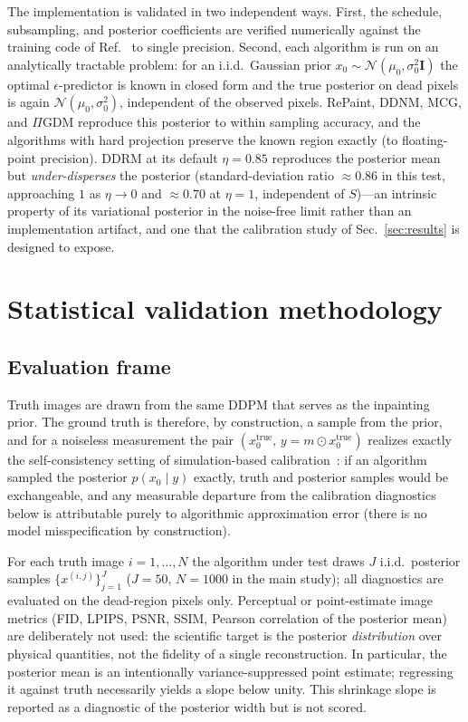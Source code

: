 The implementation is validated in two independent ways.  First, the
schedule, subsampling, and posterior coefficients are verified
numerically against the training code of Ref.~\cite{torbunov2024calo}
to single precision.  Second, each algorithm is run on an analytically
tractable problem: for an i.i.d.\ Gaussian prior
$x_0 \sim \mathcal{N}(\mu_0, \sigma_0^2 \mathbf{I})$ the optimal
$\epsilon$-predictor is known in closed form and the true posterior on
dead pixels is again $\mathcal{N}(\mu_0, \sigma_0^2)$, independent of the
observed pixels.  RePaint, DDNM, MCG, and $\Pi$GDM reproduce this
posterior to within sampling accuracy, and the algorithms with hard
projection preserve the known region exactly (to floating-point
precision).  DDRM at its default $\eta = 0.85$ reproduces the posterior
mean but \emph{under-disperses} the posterior (standard-deviation ratio
$\approx 0.86$ in this test, approaching $1$ as $\eta \to 0$ and
$\approx 0.70$ at $\eta = 1$, independent of $S$)---an intrinsic property
of its variational posterior in the noise-free limit rather than an
implementation artifact, and one that the calibration study of
Sec.~\ref{sec:results} is designed to expose.

\section{Statistical validation methodology}
\label{sec:validation}

\subsection{Evaluation frame}
\label{sec:validation:frame}

Truth images are drawn from the same DDPM that serves as the inpainting
prior.  The ground truth is therefore, by construction, a sample from the
prior, and for a noiseless measurement the pair
$(x_0^{\mathrm{true}},\, y = m \odot x_0^{\mathrm{true}})$ realizes
exactly the self-consistency setting of simulation-based
calibration~\cite{talts2018sbc}: if an algorithm sampled the posterior
$p(x_0 \mid y)$ exactly, truth and posterior samples would be
exchangeable, and any measurable departure from the calibration
diagnostics below is attributable purely to algorithmic approximation
error (there is no model misspecification by construction).

For each truth image $i = 1, \dots, N$ the algorithm under test draws
$J$ i.i.d.\ posterior samples $\{x^{(i,j)}\}_{j=1}^{J}$ ($J = 50$,
$N = 1000$ in the main study); all diagnostics are evaluated on the
dead-region pixels only.  Perceptual or point-estimate image metrics
(FID, LPIPS, PSNR, SSIM, Pearson correlation of the posterior mean) are
deliberately not used: the scientific target is the posterior
\emph{distribution} over physical quantities, not the fidelity of a
single reconstruction.  In particular, the posterior mean is an
intentionally variance-suppressed point estimate; regressing it against
truth necessarily yields a slope below unity.  This shrinkage slope is
reported as a diagnostic of the posterior width but is not scored.

